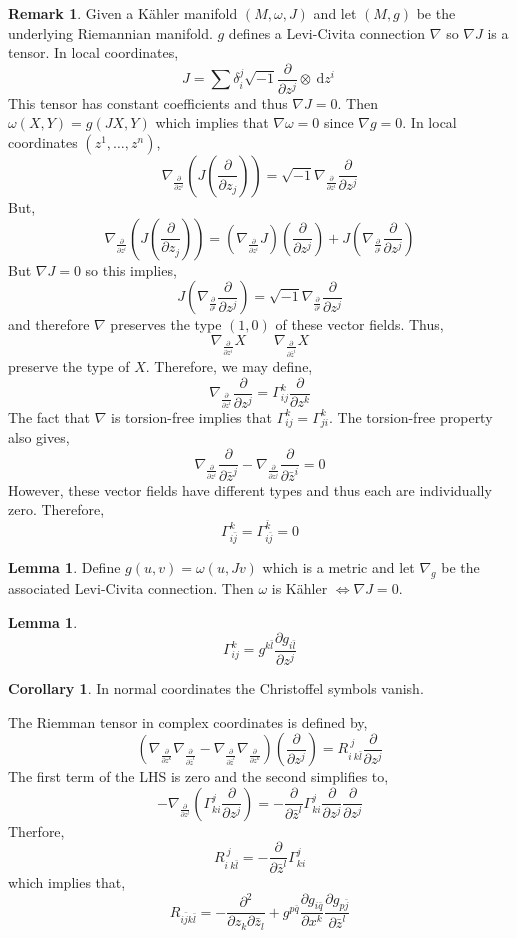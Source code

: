 \documentclass[12pt]{extarticle}
\renewcommand{\d}[1]{\: \mathrm{d}#1 \:}
\newcommand{\pderiv}[2]{\frac{\partial{#1}}{\partial{#2}}}
\theoremstyle{definition}
\newtheorem{lemma}[theorem]{Lemma}
\newtheorem{corollary}[theorem]{Corollary}
\newtheorem{remark}{Remark}
\newenvironment{definition}[1][Definition:]{\begin{trivlist}
\item[\hskip \labelsep {\bfseries #1}]}{\end{trivlist}}
\begin{document}
\begin{remark}
Given a K\"{a}hler manifold $(M, \omega, J)$ and let $(M, g)$ be the underlying Riemannian manifold. $g$ defines a Levi-Civita connection $\nabla$ so $\nabla J$ is a tensor. In local coordinates,
\[ J = \sum \delta_i^j \sqrt{-1} \pderiv{}{z^j} \otimes \d{z^i} \] 
This tensor has constant coefficients and thus $\nabla J = 0$.	Then $\omega(X, Y) = g(J X, Y)$ which implies that $\nabla \omega = 0$ since $\nabla g = 0$. In local coordinates $(z^1, \dots, z^n)$,
\[ \nabla_{\pderiv{}{z^i}} \left( J \left( \pderiv{}{z_j} \right) \right) = \sqrt{-1} \nabla_{\pderiv{}{z^i}} \pderiv{}{z^j} \]
But,
\[ \nabla_{\pderiv{}{z^i}} \left( J \left( \pderiv{}{z_j} \right) \right) = \left( \nabla_{\pderiv{}{z^i}} J \right) \left( \pderiv{}{z^j} \right) + J \left( \nabla_{\pderiv{}{^i}} \pderiv{}{z^j} \right) \]
But $\nabla J = 0$ so this implies,
\[ J \left( \nabla_{\pderiv{}{^i}} \pderiv{}{z^j} \right) = \sqrt{-1} \nabla_{\pderiv{}{^i}} \pderiv{}{z^j} \]
and therefore $\nabla$ preserves the type $(1, 0)$ of these  vector fields. Thus,
\[ \nabla_{\pderiv{}{z^i}} X \quad \quad \nabla_{\pderiv{}{\bar{z}^i}} X \]
preserve the type of $X$. Therefore, we may define,
\[ \nabla_{\pderiv{}{z^i}} \pderiv{}{z^j} = \Gamma^k_{ij} \pderiv{}{z^k} \]
The fact that $\nabla$ is torsion-free implies that $\Gamma^k_{ij} = \Gamma^k_{ji}$. The torsion-free property also gives,
\[ \nabla_{\pderiv{}{z^i}} \pderiv{}{\bar{z}^j} - \nabla_{\pderiv{}{z^j}} \pderiv{}{\bar{z}^i} = 0 \] 
However, these vector fields have different types and thus each are individually zero. Therefore,
\[ \Gamma_{i \bar{j}}^k = \Gamma^{\bar{k}}_{i \bar{j}} = 0 \]
\end{remark}

\begin{lemma}
Define $g(u, v) = \omega(u, J v)$ which is a metric and let $\nabla_g$ be the associated Levi-Civita connection. Then $\omega$ is K\"{a}hler $\iff \nabla J = 0$.
\end{lemma}	

\begin{lemma}
\[ \Gamma_{ij}^k = g^{k \bar{l}} \pderiv{g_{i \bar{l}}}{z^j} \]
\end{lemma}

\begin{corollary}
In normal coordinates the Christoffel symbols vanish.
\end{corollary}       

\begin{definition}
The Riemman tensor in complex coordinates is defined by,
\[ \left( \nabla_{\pderiv{}{z^k}} \nabla_{\pderiv{}{\bar{z}^l}}  - \nabla_{\pderiv{}{\bar{z}^l}} \nabla_{\pderiv{}{z^k}} \right) \left( \pderiv{}{z^j} \right) = R_{i \: k \bar{l}}^{\: j} \pderiv{}{z^j} \]
The first term of the LHS is zero and the second simplifies to,
\[ - \nabla_{\pderiv{}{z^l}} \left( \Gamma^j_{ki} \pderiv{}{z^j} \right) = - \pderiv{}{\bar{z}^l} \Gamma^j_{ki} \pderiv{}{z^j} \pderiv{}{z^j} \]
Therfore,
\[ R_{i \: k \bar{l}}^{\: j} = - \pderiv{}{\bar{z}^l} \Gamma^j_{ki} \]
which implies that,
\[ R_{i \bar{j} k \bar{l}} = - \frac{\partial^2}{\partial z_k \partial \bar{z}_l} + g^{p \bar{q}} \pderiv{g_{i \bar{q}}}{x^k} \pderiv{g_{p \bar{j}}}{\bar{z}^l} \]
\end{definition}
\end{document}
